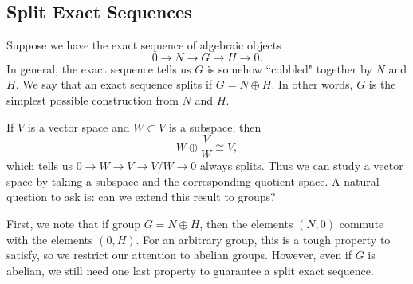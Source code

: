 \subsection{Split Exact Sequences}
Suppose we have the exact sequence of algebraic objects
\[
    0 \rightarrow N \rightarrow G \rightarrow H \rightarrow 0.
\]
In general, the exact sequence tells us $G$ is somehow ``cobbled" together by $N$ and $H$. We say that an exact sequence splits if $G = N \oplus H$. In other words, $G$ is the simplest possible construction from $N$ and $H$.

If $V$ is a vector space and $W \subset V$ is a subspace, then
\[
    W \oplus \frac{V}{W} \cong V,
\]
which tells us $0 \rightarrow W \rightarrow V \rightarrow V/W \rightarrow 0$ always splits. Thus we can study a vector space by taking a subspace and the corresponding quotient space. A natural question to ask is: can we extend this result to groups?

First, we note that if group $G = N \oplus H$, then the elements $(N, 0)$ commute with the elements $(0, H)$. For an arbitrary group, this is a tough property to satisfy, so we restrict our attention to abelian groups. However, even if $G$ is abelian, we still need one last property to guarantee a split exact sequence.
